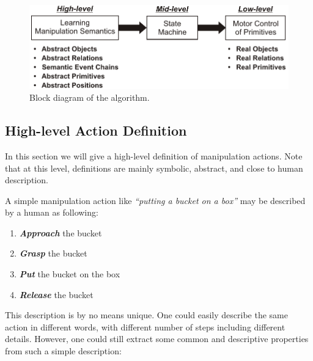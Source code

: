   
 \begin{figure}[!t]
      \centering
      \includegraphics[scale=0.55]{./pdf/Figure_BlockDiagram.pdf}
      \caption{ Block diagram of the algorithm.}
      \label{fig:blockdiagram}
\end{figure}

 

\subsection{High-level Action Definition}
\label{sec:high-level}

In this section we will give a high-level definition of manipulation actions. Note that at this level, definitions are mainly symbolic, abstract, and close to human description.



A simple manipulation action like {\it ``putting a bucket on a box''} may be described by a human as following:
\begin{enumerate}
  \item \textbf{\textit{Approach}} the bucket
  \item \textbf{\textit{Grasp}} the bucket
  \item \textbf{\textit{Put}} the bucket on the box
  \item \textbf{\textit{Release}} the bucket
\end{enumerate}

This description is by no means unique.
One could easily describe the same action in different words, with different number of steps including different details.
However, one could still extract some common and descriptive properties from such a simple description:

